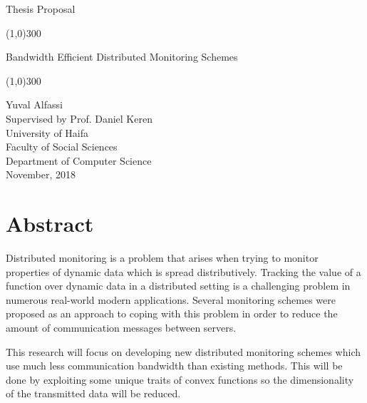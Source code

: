 \documentclass[11pt, conference]{article}
\begin{document}
	\begin{titlepage}
		\begin{center}
			\vspace*{1cm}
			\begin{Huge}
				Thesis Proposal \\
			\end{Huge}
			\vspace{1cm}
			\line(1,0){300} \\
			\vspace{0.2cm}
			\begin{Huge}
				Bandwidth Efficient Distributed Monitoring Schemes \\
			\end{Huge}
			\line(1,0){300} \\
			\vspace{1.5cm}
			\begin{Large}
				Yuval Alfassi \\
			\vspace{1cm}
				Supervised by Prof. Daniel Keren \\
			\vspace{2.5cm}
				University of Haifa \\
				Faculty of Social Sciences \\
				Department of Computer Science \\
			\vspace{1.5cm}
				November, 2018 \\
			\end{Large}
		\end{center}
	\end{titlepage}


\section*{Abstract}

Distributed monitoring is a problem that arises when trying to monitor properties of dynamic data which is spread distributively. Tracking the value of a function over dynamic data in a distributed setting is a challenging problem in numerous real-world modern applications. Several monitoring schemes were proposed as an approach to coping with this problem in order to reduce the amount of communication messages between servers.

This research will focus on developing new distributed monitoring schemes which use much less communication bandwidth than existing methods. This will be done by exploiting some unique traits of convex functions so the dimensionality of the transmitted data will be reduced.
\end{document}
